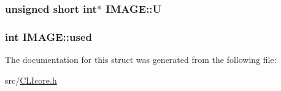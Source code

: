 \hypertarget{structIMAGE_a0e75d3dd1879fa0d0fa9caaa80a1074a}{
\subsubsection[{U}]{\setlength{\rightskip}{0pt plus 5cm}unsigned short int$\ast$ I\+M\+A\+G\+E\+::\+U}}\label{structIMAGE_a0e75d3dd1879fa0d0fa9caaa80a1074a}
\hypertarget{structIMAGE_aca4f71f11b37d19c782813e3be7dee49}{
\subsubsection[{used}]{\setlength{\rightskip}{0pt plus 5cm}int I\+M\+A\+G\+E\+::used}}\label{structIMAGE_aca4f71f11b37d19c782813e3be7dee49}


The documentation for this struct was generated from the following file\+:\begin{DoxyCompactItemize}
\item 
src/\hyperlink{CLIcore_8h}{C\+L\+Icore.\+h}\end{DoxyCompactItemize}

